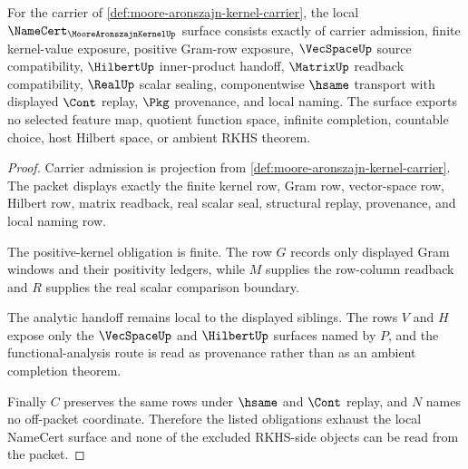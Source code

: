 \begin{theorem}
\label{thm:moore-aronszajn-kernel-namecert-obligations}
For the carrier of \autoref{def:moore-aronszajn-kernel-carrier}, the local $\NameCert_{\MooreAronszajnKernelUp}$ surface consists exactly of carrier admission, finite kernel-value exposure, positive Gram-row exposure, $\VecSpaceUp$ source compatibility, $\HilbertUp$ inner-product handoff, $\MatrixUp$ readback compatibility, $\RealUp$ scalar sealing, componentwise $\hsame$ transport with displayed $\Cont$ replay, $\Pkg$ provenance, and local naming. The surface exports no selected feature map, quotient function space, infinite completion, countable choice, host Hilbert space, or ambient RKHS theorem.
\end{theorem}
\begin{proof}
Carrier admission is projection from \autoref{def:moore-aronszajn-kernel-carrier}. The packet displays exactly the finite kernel row, Gram row, vector-space row, Hilbert row, matrix readback, real scalar seal, structural replay, provenance, and local naming row.

The positive-kernel obligation is finite. The row $G$ records only displayed Gram windows and their positivity ledgers, while $M$ supplies the row-column readback and $R$ supplies the real scalar comparison boundary.

The analytic handoff remains local to the displayed siblings. The rows $V$ and $H$ expose only the $\VecSpaceUp$ and $\HilbertUp$ surfaces named by $P$, and the functional-analysis route is read as provenance rather than as an ambient completion theorem.

Finally $C$ preserves the same rows under $\hsame$ and $\Cont$ replay, and $N$ names no off-packet coordinate. Therefore the listed obligations exhaust the local NameCert surface and none of the excluded RKHS-side objects can be read from the packet.
\end{proof}

